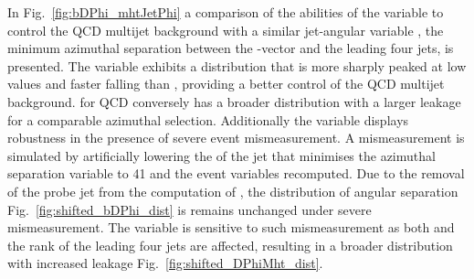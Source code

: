 In Fig.~\ref{fig:bDPhi_mhtJetPhi} a comparison of the abilities of the \bdphi variable to 
control the QCD multijet background with 
a similar jet-\mht angular variable \dphimhtj, the minimum azimuthal separation between the \mht-vector and the leading four
jets, is presented. The \bdphi variable exhibits a distribution that is more sharply peaked 
at low values and faster falling than \dphimhtj, providing a better control
of the QCD multijet background. \dphimhtj for QCD conversely has a broader 
distribution with a larger leakage for a comparable azimuthal selection. 
Additionally the \bdphi variable displays robustness in the 
presence of severe event mismeasurement. A mismeasurement is simulated by artificially lowering 
the \pt of the jet that minimises the azimuthal separation variable to 41 \GeV and the event 
variables recomputed. Due to the removal of the probe jet from the computation of \bdphi, the 
distribution of angular separation Fig.~\ref{fig:shifted_bDPhi_dist} is 
remains unchanged under severe mismeasurement. The \dphimhtj variable is sensitive to such mismeasurement
as both \mht and the rank of the leading four jets are affected, resulting in a broader distribution with
increased leakage Fig.~\ref{fig:shifted_DPhiMht_dist}.



